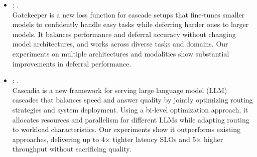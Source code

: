\begin{itemize}
    \item \citet{rabanser2025gatekeeper}: .\\[10pt]
    Gatekeeper is a new loss function for cascade setups that fine-tunes smaller models to confidently handle easy tasks while deferring harder ones to larger models. It balances performance and deferral accuracy without changing model architectures, and works across diverse tasks and domains. Our experiments on multiple architectures and modalities show substantial improvements in deferral performance.
    
    \item \citet{jiang2025cascadia}: .\\[10pt]
    Cascadia is a new framework for serving large language model (LLM) cascades that balances speed and answer quality by jointly optimizing routing strategies and system deployment. Using a bi-level optimization approach, it allocates resources and parallelism for different LLMs while adapting routing to workload characteristics. Our experiments show it outperforms existing approaches, delivering up to 4× tighter latency SLOs and 5× higher throughput without sacrificing quality.
\end{itemize}